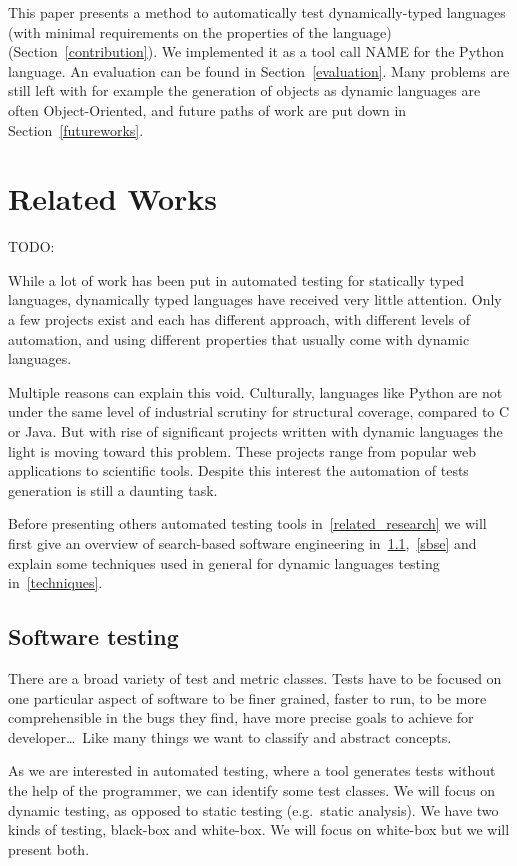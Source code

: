 \documentclass{llncs2e/llncs}
\makeatletter
\def\todo#1{{\color{red}TODO\@: #1}}
\makeatother
\begin{document}
This paper presents a method to automatically test dynamically-typed languages
(with minimal requirements on the properties of the language)
(Section~\ref{contribution}). We implemented it as a tool call NAME for the
Python language. An evaluation can be found in Section~\ref{evaluation}. Many
problems are still left with for example the generation of objects as dynamic
languages are often Object-Oriented, and future paths of work are put down in
Section~\ref{futureworks}.


\section{Related Works}
\label{relatedwork}
\todo{}

While a lot of work has been put in automated testing for statically typed
languages, dynamically typed languages have received very little attention. Only
a few projects exist and each has different approach, with different levels of
automation, and using different properties that usually come with dynamic
languages.

Multiple reasons can explain this void. Culturally, languages like Python are
not under the same level of industrial scrutiny for structural coverage,
compared to C or Java. But with rise of significant projects written with
dynamic languages the light is moving toward this problem. These projects range
from popular web applications to scientific tools. Despite this interest the
automation of tests generation is still a daunting task.

Before presenting others automated testing tools in~\ref{related_research} we
will first give an overview of search-based software engineering in~\ref{st},~\ref{sbse}
and explain some techniques used in general for dynamic languages testing
in~\ref{techniques}.

\subsection{Software testing}
\label{st}

There are a broad variety of test and metric classes. Tests have to be focused
on one particular aspect of software to be finer grained, faster to run, to be
more comprehensible in the bugs they find, have more precise goals to achieve
for developer\dots\ Like many things we want to classify and abstract concepts.

As we are interested in automated testing, where a tool generates tests without
the help of the programmer, we can identify some test classes. We will focus on
dynamic testing, as opposed to static testing (e.g.\ static analysis). We have
two kinds of testing, black-box and white-box. We will focus on white-box but we
will present both.
\end{document}
